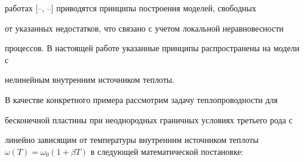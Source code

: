 работах [--, --] приводятся принципы построения моделей, свободных

от указанных недостатков, что связано с учетом локальной неравновесности

процессов. В настоящей работе указанные принципы распространены на модели с

нелинейным внутренним источником теплоты.



В качестве конкретного примера рассмотрим задачу теплопроводности для

бесконечной пластины при неоднородных граничных условиях третьего рода с

линейно зависящим от температуры внутренним источником теплоты $\omega

(T)=\omega _0 (1+\beta T)$ в следующей математической постановке:



